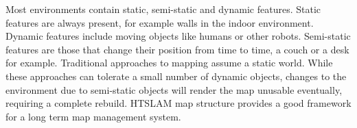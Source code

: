 Most environments contain static, semi-static and dynamic
features. Static features are always present, for example walls in the
indoor environment. Dynamic features include moving objects like
humans or other robots. Semi-static features are those that change
their position from time to time, a couch or a desk for
example. Traditional approaches to mapping assume a static
world. While these approaches can tolerate a small number of dynamic
objects, changes to the environment due to semi-static objects will
render the map unusable eventually, requiring a complete rebuild.
HTSLAM map structure provides a good framework for a long term map
management system.





